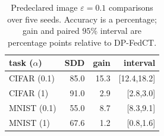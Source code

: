 \begin{table}[t]
\centering
\caption{Predeclared image $\varepsilon=0.1$ comparisons over five seeds. Accuracy is a percentage; gain and paired $95\%$ interval are percentage points relative to DP-FedCT.}
\label{tab:new-effects}
\small\setlength{\tabcolsep}{3pt}
\begin{tabular}{@{}lrrr@{}}\toprule
task ($\alpha$) & SDD & gain & interval \\\midrule
CIFAR (0.1) & 85.0 & 15.3 & [12.4,18.2] \\
CIFAR (1) & 91.0 & 2.9 & [2.8,3.0] \\
MNIST (0.1) & 55.0 & 8.7 & [8.3,9.1] \\
MNIST (1) & 67.6 & 1.2 & [0.8,1.6] \\
\bottomrule\end{tabular}
\end{table}
